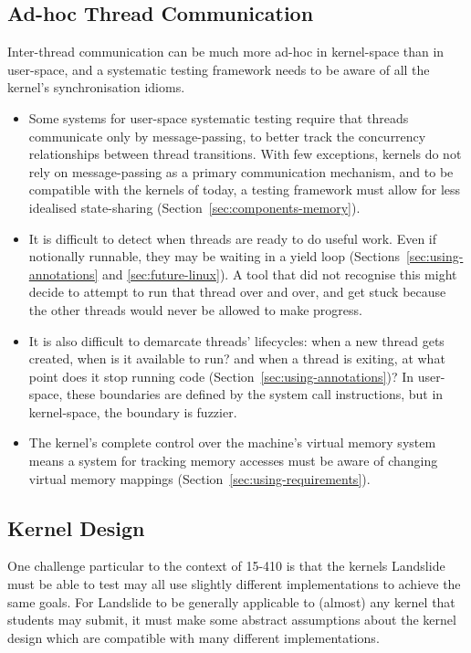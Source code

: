 \subsection{Ad-hoc Thread Communication}

Inter-thread communication can be much more ad-hoc in kernel-space than in user-space\cite{datacollider}, and a systematic testing framework needs to be aware of all the kernel's synchronisation idioms.

\begin{itemize}
	\item Some systems for user-space systematic testing require that threads communicate only by message-passing, to better track the concurrency relationships between thread transitions\cite{dbug-ssv}. With few exceptions\cite{barrelfish}, kernels do not rely on message-passing as a primary communication mechanism, and to be compatible with the kernels of today, a testing framework must allow for less idealised state-sharing (Section~\ref{sec:components-memory}).
	\item It is difficult to detect when threads are ready to do useful work. Even if notionally runnable, they may be waiting in a yield loop (Sections~\ref{sec:using-annotations} and \ref{sec:future-linux}). A tool that did not recognise this might decide to attempt to run that thread over and over, and get stuck because the other threads would never be allowed to make progress.
	\item It is also difficult to demarcate threads' lifecycles: when a new thread gets created, when is it available to run? and when a thread is exiting, at what point does it stop running code (Section~\ref{sec:using-annotations})? In user-space, these boundaries are defined by the system call instructions, but in kernel-space, the boundary is fuzzier.
	\item The kernel's complete control over the machine's virtual memory system means a system for tracking memory accesses must be aware of changing virtual memory mappings (Section~\ref{sec:using-requirements}).
\end{itemize}

\subsection{Kernel Design}

One challenge particular to the context of 15-410 is that the kernels Landslide must be able to test may all use slightly different implementations to achieve the same goals. For Landslide to be generally applicable to (almost) any kernel that students may submit, it must make some abstract assumptions about the kernel design which are compatible with many different implementations.

